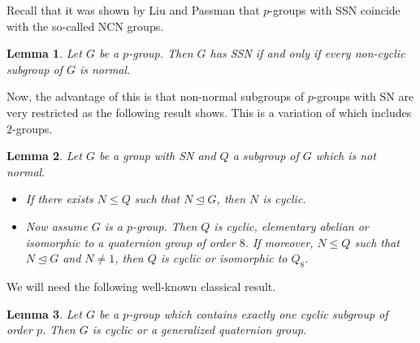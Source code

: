 \documentclass[a4paper,10pt]{amsart}
\newtheorem{lemma}{Lemma}[section]
\theoremstyle{definition}
\theoremstyle{remark}
\begin{document}
Recall that it was shown by Liu and Passman that $p$-groups with SSN coincide with the so-called NCN groups.

\begin{lemma}\label{lem:LiuPassma2.2}\cite[Proposition 2.2]{LiuPassman16}
Let $G$ be a $p$-group. Then $G$ has SSN if and only if every non-cyclic subgroup of $G$ is normal.
\end{lemma}

Now, the advantage of this is that non-normal subgroups of $p$-groups with SN are very restricted as the  following result shows. This is a variation of \cite[Lemma 3.2]{Liu} which includes $2$-groups.
\begin{lemma}\label{lem:OurLemma3.2}
Let $G$ be a group with SN and $Q$ a subgroup of $G$ which is not normal.
\begin{itemize}
\item[a)] If there exists $N \leq Q$ such that $N \unlhd G$, then $N$ is cyclic.
\item[b)] Now assume $G$ is a $p$-group. Then $Q$ is cyclic, elementary abelian or isomorphic to a quaternion group of order $8$. If moreover, $N \leq Q$ such that $N \unlhd G$ and $N \neq 1$, then $Q$ is cyclic or isomorphic to $Q_8$.
\end{itemize}
\end{lemma}

We will need the following well-known classical result.

\begin{lemma}\label{lem:OneCyclicSubgroup}\cite[III, Satz 8.2]{Huppert}
Let $G$ be a $p$-group which contains exactly one cyclic subgroup of order $p$. Then $G$ is cyclic or a generalized quaternion group.
\end{lemma}
\end{document}
